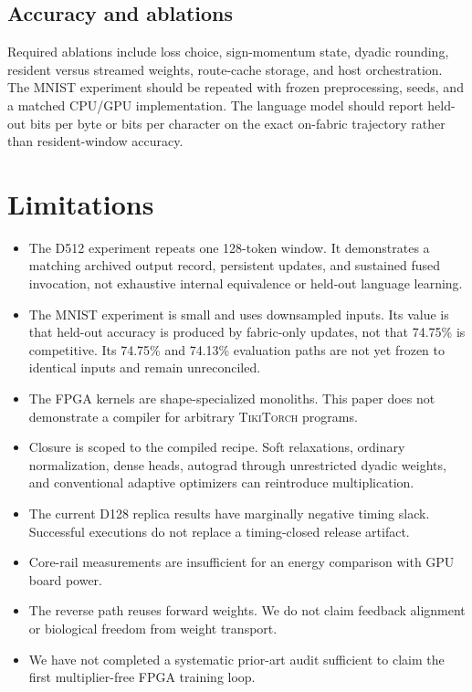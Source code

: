 \documentclass[10pt]{article}
\newcommand{\tikitorch}{\textsc{TikiTorch}}
\begin{document}
\subsection{Accuracy and ablations}

Required ablations include loss choice, sign-momentum state, dyadic rounding,
resident versus streamed weights, route-cache storage, and host orchestration.
The MNIST experiment should be repeated with frozen preprocessing, seeds, and a
matched CPU/GPU implementation.  The language model should report held-out
bits per byte or bits per character on the exact on-fabric trajectory rather
than resident-window accuracy.

\section{Limitations}

\begin{itemize}
  \item The D512 experiment repeats one 128-token window.  It demonstrates a
  matching archived output record, persistent updates, and sustained fused
  invocation, not exhaustive internal equivalence or held-out language
  learning.
  \item The MNIST experiment is small and uses downsampled inputs.  Its value is
  that held-out accuracy is produced by fabric-only updates, not that 74.75\%
  is competitive.  Its 74.75\% and 74.13\% evaluation paths are not yet frozen
  to identical inputs and remain unreconciled.
  \item The FPGA kernels are shape-specialized monoliths.  This paper does not
  demonstrate a compiler for arbitrary \tikitorch{} programs.
  \item Closure is scoped to the compiled recipe.  Soft relaxations, ordinary
  normalization, dense heads, autograd through unrestricted dyadic weights,
  and conventional adaptive optimizers can reintroduce multiplication.
  \item The current D128 replica results have marginally negative timing slack.
  Successful executions do not replace a timing-closed release artifact.
  \item Core-rail measurements are insufficient for an energy comparison with
  GPU board power.
  \item The reverse path reuses forward weights.  We do not claim feedback
  alignment or biological freedom from weight transport.
  \item We have not completed a systematic prior-art audit sufficient to claim
  the first multiplier-free FPGA training loop.
\end{itemize}
\end{document}
